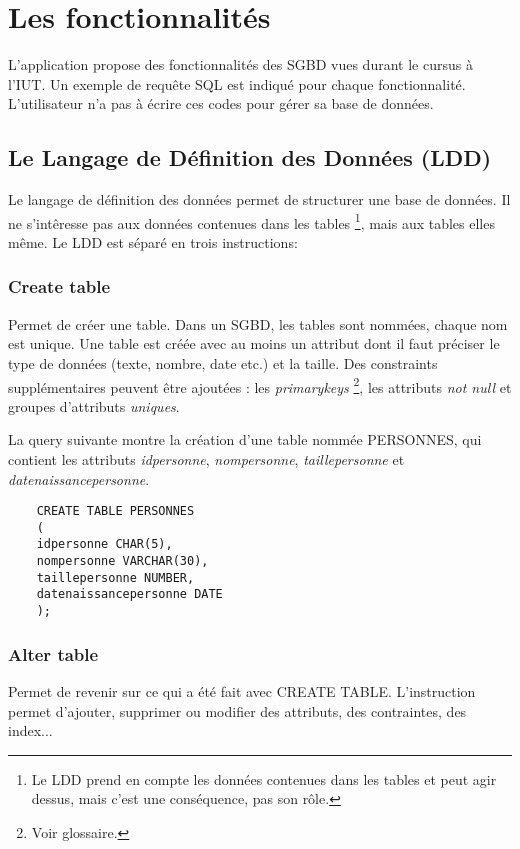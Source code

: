 \section{Les fonctionnalités}
L'application propose des fonctionnalités des SGBD vues durant le cursus à l'IUT.
Un exemple de requête SQL est indiqué pour chaque fonctionnalité.
L'utilisateur n'a pas à écrire ces codes pour gérer sa base de données.

\subsection{Le Langage de Définition des Données (LDD)}
Le langage de définition des données permet de structurer une base de données.
Il ne s'intêresse pas aux données contenues dans les tables
\footnote{\label{interet_ldd}Le LDD prend en compte les données contenues dans les tables et peut agir dessus, mais c'est une conséquence, pas son rôle.}, mais aux tables elles même. Le LDD est séparé en trois instructions:

\subsubsection{Create table}
Permet de créer une \gls{table}. Dans un SGBD, les tables sont nommées, chaque nom est unique.
Une table est créée avec au moins un attribut dont il faut préciser le type de données (texte, nombre, date etc.) et la taille.
Des \glspl{constraint} supplémentaires peuvent être ajoutées : les \textit{\glspl{primarykey}} \footnote{\label{contrainte_clée_primaire}Voir glossaire.}, les attributs \textit{not null} et groupes d'attributs \textit{uniques}.

La \gls{query} suivante montre la création d'une table nommée PERSONNES, qui contient les attributs \textit{idpersonne}, \textit{nompersonne}, \textit{taillepersonne} et \textit{datenaissancepersonne}.

  \begin{lstlisting}
    CREATE TABLE PERSONNES
    (
    idpersonne CHAR(5),
    nompersonne VARCHAR(30),
    taillepersonne NUMBER,
    datenaissancepersonne DATE
    );
  \end{lstlisting}

\subsubsection{Alter table}
Permet de revenir sur ce qui a été fait avec CREATE TABLE.
L'instruction permet d'ajouter, supprimer ou modifier des \glspl{attribut}, des contraintes, des index...

